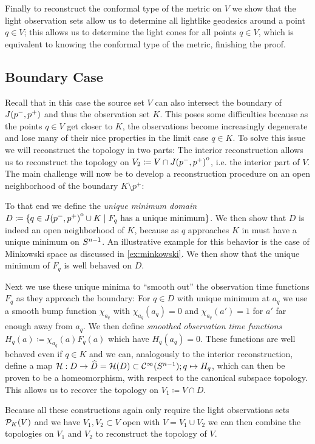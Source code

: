 Finally to reconstruct the conformal type of the metric on $V$ we show that the light observation sets allow us to determine all lightlike geodesics around a point $q\in V$; this allows us to determine the light cones for all points $q\in V$, which is equivalent to knowing the conformal type of the metric, finishing the proof.

\subsection{Boundary Case}
Recall that in this case the source set $V$ can also intersect the boundary of $J(p^-,p^+)$ and thus the observation set $K$. This poses some difficulties because as the points $q\in V$ get closer to $K$, the observations become increasingly degenerate and lose many of their nice properties in the limit case $q\in K$.
 To solve this issue we will reconstruct the topology in two parts: The interior reconstruction allows us to reconstruct the topology on $V_2\coloneqq  V \cap {\kern0ptJ(p^-,p^+)}^{\mathrm{o}}$, i.e. the interior part of $V$. The main challenge will now be to develop a reconstruction procedure on an open neighborhood of the boundary $K\setminus p^+$:

To that end we define the \emph{unique minimum domain} $D\coloneqq \{q\in {\kern0ptJ(p^-,p^+)}^{\mathrm{o}}\cup K \mid F_q \text{ has a unique minimum}\}$. We then show that $D$ is indeed an open neighborhood of $K$, because as $q$ approaches $K$ in must have a unique minimum on ${S^{n-1}}$. An illustrative example for this behavior is the case of Minkowski space as discussed in \ref{ex:minkowski}. We then show that the unique minimum of $F_q$ is well behaved on $D$.

Next we use these unique minima to \enquote{smooth out} the observation time functions $F_q$ as they approach the boundary: For $q\in D$ with unique minimum at $a_q$ we use a smooth bump function $\chi_{a_q}$ with $\chi_{a_q}(a_q)=0$ and $\chi_{a_q}(a')=1$ for $a'$ far enough away from $a_q$. We then define \emph{smoothed observation time functions} $H_q(a)\coloneqq \chi_{a_q}(a)F_q(a)$ which have $H_q(a_q)=0$. These functions are well behaved even if $q\in K$ and we can, analogously to the interior reconstruction, define a map ${\mathcal{H}}:D\to \widehat{D} = {\mathcal{H}}(D)\subset {\mathcal{C}}^\infty({S^{n-1}}); q\mapsto H_q$, which can then be proven to be a homeomorphism, with respect to the canonical subspace topology. This allows us to recover the topology on $V_1\coloneqq  V\cap D$.

Because all these constructions again only require the light observations sets ${\mathcal{P}}_K(V)$ and we have $V_1, V_2\subset V$ open with $V=V_1\cup V_2$ we can then combine the topologies on $V_1$ and $V_2$ to reconstruct the topology of $V$.

